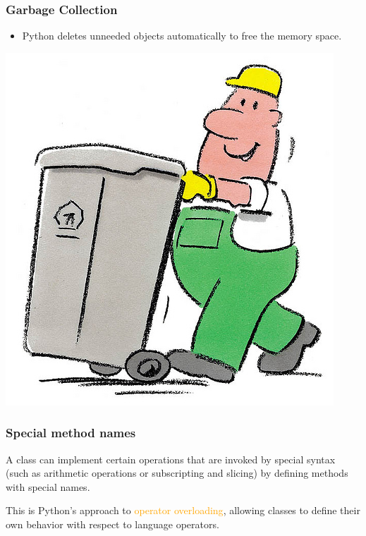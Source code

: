 \documentclass{../py-lecture}
\begin{document}
\begin{frame}
	\frametitle{Garbage Collection}
  \begin{itemize}
    \item Python deletes unneeded objects automatically to free the memory space.
  \end{itemize}
	\centering \includegraphics[width=.4\textwidth]{img/garbage.jpg}
\end{frame}

\begin{frame}
	\frametitle{Special method names}
  \par
  A class can implement certain operations that are invoked by special syntax (such as arithmetic operations or subscripting and slicing) by defining methods with special names.
  \par
  This is Python’s approach to \textcolor{Orange}{operator overloading}, allowing classes to define their own behavior with respect to language operators.
\end{frame}
\end{document}
